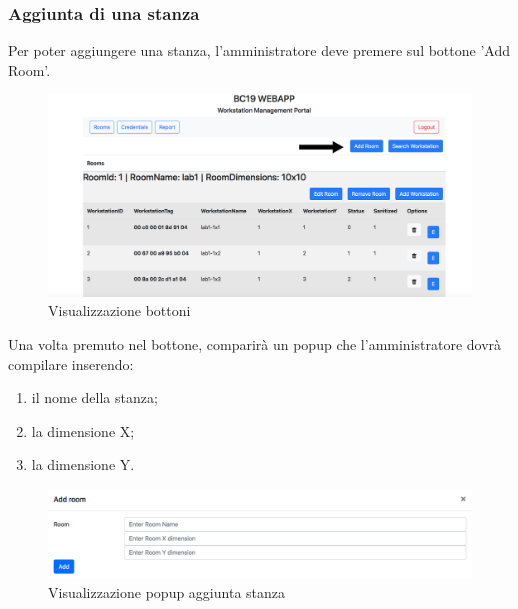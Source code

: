 \subsubsection{Aggiunta di una stanza}
Per poter aggiungere una stanza, l'amministratore deve premere sul bottone 'Add Room'.
\begin{figure}[H]
	\centering
	\includegraphics[width=15cm]{res/images/bottoneAddRoom.png}
	\caption{Visualizzazione bottoni}
\end{figure}
Una volta premuto nel bottone, comparirà un popup che l'amministratore dovrà compilare inserendo:
\begin{enumerate}
\item il nome della stanza;
\item la dimensione X;
\item la dimensione Y.
\end{enumerate}
\begin{figure}[H]
	\centering
	\includegraphics[width=15cm]{res/images/aggiungiStanza1.png}
	\caption{Visualizzazione popup aggiunta stanza}
\end{figure}


